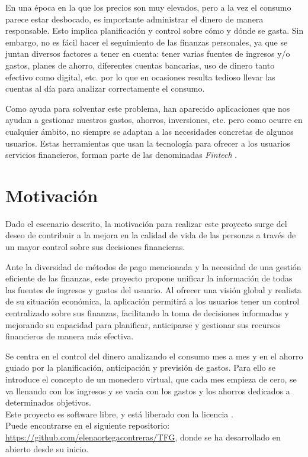 En una época en la que los precios son muy elevados, pero a la vez el consumo parece estar desbocado, es importante administrar el dinero de manera responsable. Esto implica planificación y control sobre cómo y dónde se gasta. Sin embargo, no es fácil hacer el seguimiento de las finanzas personales, ya que se juntan diversos factores a tener en cuenta: tener varias fuentes de ingresos y/o gastos, planes de ahorro, diferentes cuentas bancarias, uso de dinero tanto efectivo como digital, etc. por lo que en ocasiones resulta tedioso llevar las cuentas al día para analizar correctamente el consumo.

Como ayuda para solventar este problema, han aparecido aplicaciones que nos ayudan a gestionar nuestros gastos, ahorros, inversiones, etc. pero como ocurre en cualquier ámbito, no siempre se adaptan a las necesidades concretas de algunos usuarios. Estas herramientas que usan la tecnología para ofrecer a los usuarios servicios financieros, forman parte de las denominadas \textit{Fintech} \cite{schueffel2016taming}.

\section{Motivación}
Dado el escenario descrito, la motivación para realizar este proyecto surge del deseo de contribuir a la mejora en la calidad de vida de las personas a través de un mayor control sobre sus decisiones financieras. 

Ante la diversidad de métodos de pago mencionada y la necesidad de una gestión eficiente de las finanzas, este proyecto propone unificar la información de todas las fuentes de ingresos y gastos del usuario. Al ofrecer una visión global y realista de su situación económica, la aplicación permitirá a los usuarios tener un control centralizado sobre sus finanzas, facilitando la toma de decisiones informadas y mejorando su capacidad para planificar, anticiparse y gestionar sus recursos financieros de manera más efectiva.

Se centra en el control del dinero analizando el consumo mes a mes y en el ahorro guiado por la planificación, anticipación y previsión de gastos. Para ello se introduce el concepto de un monedero virtual, que cada mes empieza de cero, se va llenando con los ingresos y se vacía con los gastos y los ahorros dedicados a determinados objetivos. \\

Este proyecto es software libre, y está liberado con la licencia \cite{gplv3}.\\
Puede encontrarse en el siguiente repositorio:\\
\href{https://github.com/elenaortegacontreras/TFG}{https://github.com/elenaortegacontreras/TFG}, 
donde se ha desarrollado en abierto desde su inicio.

